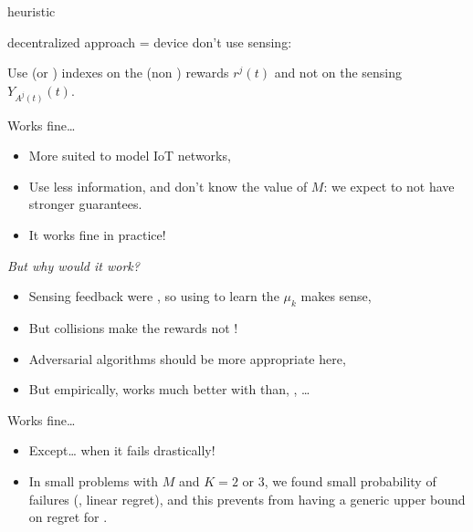 \documentclass[12pt,english,ignorenonframetext,aspectratio=169,]{beamer}
\providecommand{\tightlist}{%
  \setlength{\itemsep}{0pt}\setlength{\parskip}{0pt}}
\begin{document}
\begin{frame}[allowframebreaks]{\Selfish{} heuristic}

\Selfish{} decentralized approach = device don't use sensing:

\begin{block}{\Selfish}
  Use \UCB{} (or \klUCB) indexes on the (non \iid) rewards \(r^j(t)\)
  and not on the sensing $Y_{A^j(t)}(t)$.
\end{block}

\begin{block}{Works fine\ldots{}}

\begin{itemize}
\tightlist
\item
  More suited to model IoT networks,
\item
  Use less information, and don't know the value of \(M\): we expect
  \Selfish{} to not have stronger guarantees.
\item
  It works fine in practice!
\end{itemize}

\end{block}

\begin{block}{\emph{But why would it work?}}

\begin{itemize}
\tightlist
\item
  Sensing feedback were \iid, so using \UCB{} to learn the \(\mu_k\) makes sense,
\item
  But collisions make the rewards not \iid{} !
\item
  Adversarial algorithms should be more appropriate here,
\item
  But empirically, \Selfish{} works much better with \klUCB{}
  than, \eg, \ExpThree\ldots{}
\end{itemize}

\end{block}

\begin{block}{Works fine\ldots{}}

\begin{itemize}
\tightlist
\item
  Except\ldots{} when it fails drastically! \Sadey[1.3]
\item
  In small problems with \(M\) and \(K = 2\) or \(3\), we found small
  probability of failures (\ie, linear regret), and this prevents from
  having a generic upper bound on regret for \Selfish.
\end{itemize}

\end{block}

\end{frame}
\end{document}
